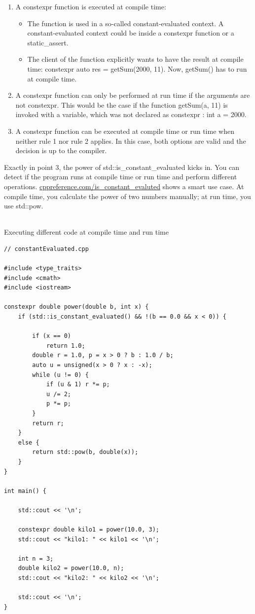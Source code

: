 \begin{enumerate}
\item 
A constexpr function is executed at compile time:
\begin{itemize}
\item 
The function is used in a so-called constant-evaluated context. A constant-evaluated context could be inside a constexpr function or a static\_assert.

\item 
The client of the function explicitly wants to have the result at compile time: constexpr auto res = getSum(2000, 11). Now, getSum() has to run at compile time.
\end{itemize}

\item 
A constexpr function can only be performed at run time if the arguments are not constexpr. This would be the case if the function getSum(a, 11) is invoked with a variable, which was not declared as constexpr : int a = 2000.

\item 
A constexpr function can be executed at compile time or run time when neither rule 1 nor rule 2 applies. In this case, both options are valid and the decision is up to the compiler.
\end{enumerate}

Exactly in point 3, the power of std::is\_constant\_evaluated kicks in. You can detect if the program runs at compile time or run time and perform different operations. \href{https://en.cppreference.com/w/cpp/types/is_constant_evaluated}{cppreference.com/is\_constant\_evaluted} shows a smart use case. At compile time, you calculate the power of two numbers manually; at run time, you use std::pow.

\hspace*{\fill} \\ %
\noindent
Executing different code at compile time and run time
\begin{lstlisting}[style=styleCXX]
// constantEvaluated.cpp

#include <type_traits>
#include <cmath>
#include <iostream>

constexpr double power(double b, int x) {
	if (std::is_constant_evaluated() && !(b == 0.0 && x < 0)) {
		
		if (x == 0)
			return 1.0;
		double r = 1.0, p = x > 0 ? b : 1.0 / b;
		auto u = unsigned(x > 0 ? x : -x);
		while (u != 0) {
			if (u & 1) r *= p;
			u /= 2;
			p *= p;
		}
		return r;
	}
	else {
		return std::pow(b, double(x));
	}
}

int main() {
	
	std::cout << '\n';
	
	constexpr double kilo1 = power(10.0, 3);
	std::cout << "kilo1: " << kilo1 << '\n';
	
	int n = 3;
	double kilo2 = power(10.0, n);
	std::cout << "kilo2: " << kilo2 << '\n';
	
	std::cout << '\n';
}
\end{lstlisting}

